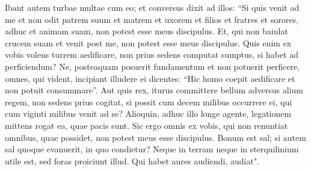 \begin{biblechapter}
\verse Ibant autem turbae multae cum eo; et conversus dixit ad illos: 
\verse “Si quis venit ad me et non odit patrem suum et matrem et uxorem et filios et fratres et sorores, adhuc et animam suam, non potest esse meus discipulus.  
\verse Et, qui non baiulat crucem suam et venit post me, non potest esse meus discipulus. 
\verse Quis enim ex vobis volens turrem aedificare, non prius sedens computat sumptus, si habet ad perficiendum? 
\verse Ne, posteaquam posuerit fundamentum et non potuerit perficere, omnes, qui vident, incipiant illudere ei 
\verse dicentes: “Hic homo coepit aedificare et non potuit consummare”. 
\verse Aut quis rex, iturus committere bellum adversus alium regem, non sedens prius cogitat, si possit cum decem milibus occurrere ei, qui cum viginti milibus venit ad se?  
\verse Alioquin, adhuc illo longe agente, legationem mittens rogat ea, quae pacis sunt. 
\verse Sic ergo omnis ex vobis, qui non renuntiat omnibus, quae possidet, non potest meus esse discipulus. 
\verse Bonum est sal; si autem sal quoque evanuerit, in quo condietur? 
\verse Neque in terram neque in sterquilinium utile est, sed foras proiciunt illud. Qui habet aures audiendi, audiat". 
\end{biblechapter}

